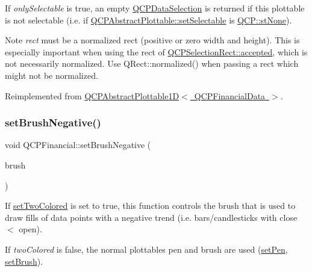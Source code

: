 If {\itshape only\+Selectable} is true, an empty \mbox{\hyperlink{class_q_c_p_data_selection}{Q\+C\+P\+Data\+Selection}} is returned if this plottable is not selectable (i.\+e. if \mbox{\hyperlink{class_q_c_p_abstract_plottable_ac238d6e910f976f1f30d41c2bca44ac3}{Q\+C\+P\+Abstract\+Plottable\+::set\+Selectable}} is \mbox{\hyperlink{namespace_q_c_p_ac6cb9db26a564b27feda362a438db038aa64628e338a2dd1e6f0dc84dec0b63fe}{Q\+C\+P\+::st\+None}}).

\begin{DoxyNote}{Note}
{\itshape rect} must be a normalized rect (positive or zero width and height). This is especially important when using the rect of \mbox{\hyperlink{class_q_c_p_selection_rect_a15a43542e1f7b953a44c260b419e6d2c}{Q\+C\+P\+Selection\+Rect\+::accepted}}, which is not necessarily normalized. Use {\ttfamily Q\+Rect\+::normalized()} when passing a rect which might not be normalized. 
\end{DoxyNote}


Reimplemented from \mbox{\hyperlink{class_q_c_p_abstract_plottable1_d_a22377bf6e57ab7eedbc9e489250c6ded}{Q\+C\+P\+Abstract\+Plottable1\+D$<$ Q\+C\+P\+Financial\+Data $>$}}.

\mbox{\label{class_q_c_p_financial_a8bbdd87629f9144b3ef51af660c0961a}} 
\subsubsection{\texorpdfstring{setBrushNegative()}{setBrushNegative()}}
{\footnotesize\ttfamily void Q\+C\+P\+Financial\+::set\+Brush\+Negative (\begin{DoxyParamCaption}\item[{const Q\+Brush \&}]{brush }\end{DoxyParamCaption})}

If \mbox{\hyperlink{class_q_c_p_financial_a138e44aac160a17a9676652e240c5f08}{set\+Two\+Colored}} is set to true, this function controls the brush that is used to draw fills of data points with a negative trend (i.\+e. bars/candlesticks with close $<$ open).

If {\itshape two\+Colored} is false, the normal plottable\textquotesingle{}s pen and brush are used (\mbox{\hyperlink{class_q_c_p_abstract_plottable_ab74b09ae4c0e7e13142fe4b5bf46cac7}{set\+Pen}}, \mbox{\hyperlink{class_q_c_p_abstract_plottable_a7a4b92144dca6453a1f0f210e27edc74}{set\+Brush}}).

